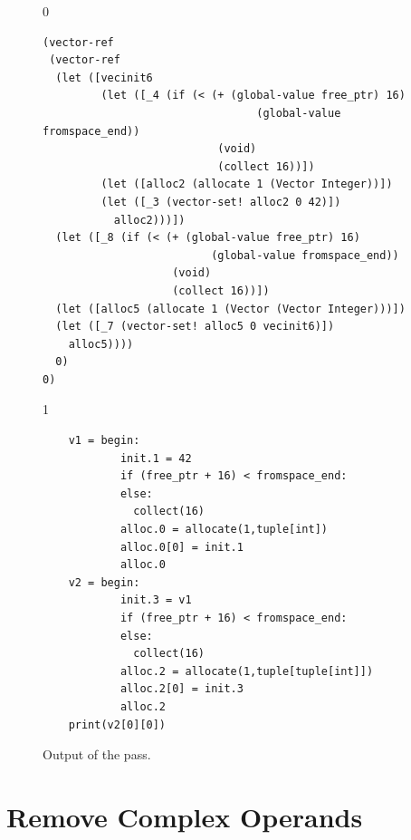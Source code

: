 \documentclass[7x10]{TimesAPriori_MIT}%
\def\racketEd{0}
\def\pythonEd{1}
\def\edition{1}
\newcommand{\pythonColor}[0]{}
\numberwithin{theorem}{chapter}
\numberwithin{definition}{chapter}
\numberwithin{equation}{chapter}
\begin{document}
\begin{figure}[tbp]
  \begin{tcolorbox}[colback=white]
{\if\edition\racketEd
\begin{lstlisting}
(vector-ref
 (vector-ref
  (let ([vecinit6
         (let ([_4 (if (< (+ (global-value free_ptr) 16)
                                 (global-value fromspace_end))
                           (void)
                           (collect 16))])
         (let ([alloc2 (allocate 1 (Vector Integer))])
         (let ([_3 (vector-set! alloc2 0 42)])
           alloc2)))])
  (let ([_8 (if (< (+ (global-value free_ptr) 16)
                          (global-value fromspace_end))
                    (void)
                    (collect 16))])
  (let ([alloc5 (allocate 1 (Vector (Vector Integer)))])
  (let ([_7 (vector-set! alloc5 0 vecinit6)])
    alloc5))))
  0)
0)
\end{lstlisting}
\fi}
{\if\edition\pythonEd\pythonColor
\begin{lstlisting}
    v1 = begin:
            init.1 = 42
            if (free_ptr + 16) < fromspace_end:
            else:
              collect(16)
            alloc.0 = allocate(1,tuple[int])
            alloc.0[0] = init.1
            alloc.0
    v2 = begin:
            init.3 = v1
            if (free_ptr + 16) < fromspace_end:
            else:
              collect(16)
            alloc.2 = allocate(1,tuple[tuple[int]])
            alloc.2[0] = init.3
            alloc.2
    print(v2[0][0])
\end{lstlisting}
\fi}
  \end{tcolorbox}
\caption{Output of the  pass.}
\label{fig:expose-alloc-output}
\end{figure}


\section{Remove Complex Operands}
\label{sec:remove-complex-opera-Lvec}
\end{document}
